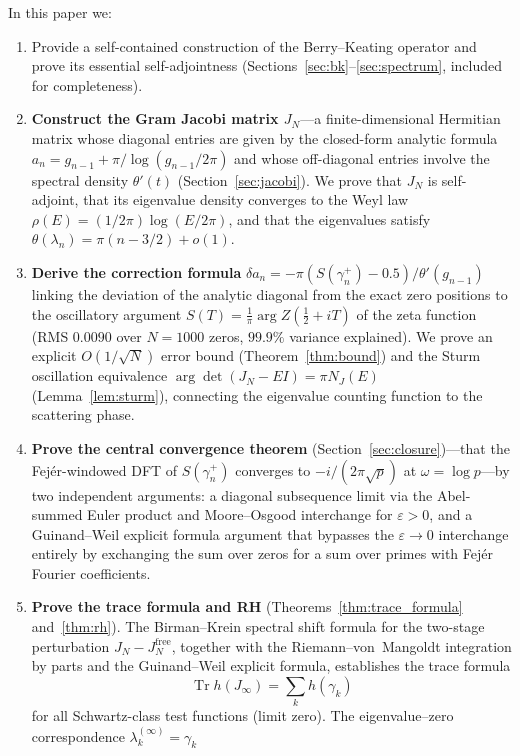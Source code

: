\documentclass{pre-aomart}
\def\zeta{Z}%
\theoremstyle{plain}
\theoremstyle{definition}
\theoremstyle{remark}
\begin{document}
In this paper we:
\begin{enumerate}
\item Provide a self-contained construction of the Berry--Keating
  operator and prove its essential self-adjointness
  (Sections~\ref{sec:bk}--\ref{sec:spectrum}, included for completeness).
\item \textbf{Construct the Gram Jacobi matrix $J_N$}---a finite-dimensional
  Hermitian matrix whose diagonal entries are given by the closed-form
  analytic formula $a_n = g_{n-1} + \pi/\log(g_{n-1}/2\pi)$ and whose
  off-diagonal entries involve the spectral density $\theta'(t)$
  (Section~\ref{sec:jacobi}).  We prove that $J_N$ is self-adjoint,
  that its eigenvalue density converges to the Weyl law
  $\rho(E) = (1/2\pi)\log(E/2\pi)$, and that the eigenvalues satisfy
  $\theta(\lambda_n) = \pi(n - 3/2) + o(1)$.
\item \textbf{Derive the correction formula}
  $\delta a_n = -\pi(S(\gamma_n^+) - 0.5)/\theta'(g_{n-1})$ linking the
  deviation of the analytic diagonal from the exact zero positions to the
  oscillatory argument $S(T) = \frac{1}{\pi}\arg\zeta(\frac12 + iT)$ of the
  zeta function (RMS $0.0090$ over $N=1000$ zeros, $99.9\%$ variance
  explained).  We prove an explicit $O(1/\sqrt{N})$ error bound
  (Theorem~\ref{thm:bound}) and the Sturm oscillation equivalence
  $\arg\det(J_N - EI) = \pi N_J(E)$ (Lemma~\ref{lem:sturm}), connecting the
  eigenvalue counting function to the scattering phase.
\item \textbf{Prove the central convergence theorem}
  (Section~\ref{sec:closure})---that the Fej\'er-windowed DFT of
  $S(\gamma_n^+)$ converges to $-i/(2\pi\sqrt{p})$ at $\omega = \log p$---by
  two independent arguments: a diagonal subsequence limit via the Abel-summed
  Euler product and Moore--Osgood interchange for $\varepsilon>0$, and a
  Guinand--Weil explicit formula argument that bypasses the $\varepsilon\to0$
  interchange entirely by exchanging the sum over zeros for a sum over primes
  with Fej\'er Fourier coefficients.
\item \textbf{Prove the trace formula and RH}
  (Theorems~\ref{thm:trace_formula} and~\ref{thm:rh}).
  The Birman--Krein spectral shift formula for the two-stage
  perturbation $J_N - J_N^{\mathrm{free}}$, together with the
  Riemann--von~Mangoldt integration by parts and the Guinand--Weil
  explicit formula, establishes the trace formula
  \[
  \operatorname{Tr}h(J_\infty) = \sum_k h(\gamma_k)
  \]
  for all Schwartz-class test functions (limit zero).
  The eigenvalue--zero correspondence $\lambda_k^{(\infty)} = \gamma_k$

\end{enumerate}
\end{document}
